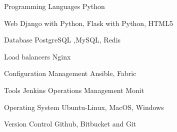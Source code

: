 

\begin{cvskills}

  \cvskill
    {Programming Languages} %
    {Python} %

  \cvskill
    {Web} %
    {Django with Python, Flask with Python, HTML5} %

  \cvskill
    {Database} %
    {PostgreSQL ,MySQL, Redis } %

  \cvskill
    {Load balancers} %
    {Nginx} %

  \cvskill
    {Configuration Management} %
    {Ansible, Fabric} %

  \cvskill
    {Tools} %
    {Jenkins} %
  \cvskill
    {Operations Management} %
    {Monit} %

  \cvskill
    {Operating System} %
    {Ubuntu-Linux, MacOS, Windows} %

  \cvskill
    {Version Control} %
    {Github, Bitbucket and Git} %


\end{cvskills}
